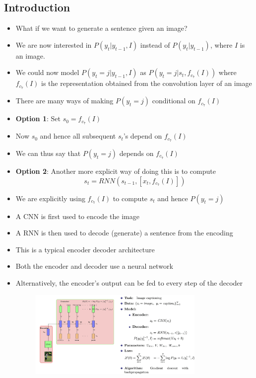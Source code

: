 \documentclass[a4paper]{article}
\begin{document}
\subsection{Introduction}
\begin{itemize}
    \item What if we want to generate a sentence given an image?
    \item We are now interested in $P(y_t|y_{t-1},I)$ instead of $P(y_t|y_{t-1})$, where $I$ is an image.
    \item We could now model $P(y_t = j|y_{t-1},I)$ as $P(y_t=j|s_t,f_{c_7}(I))$ where $f_{c_7}(I)$ is the representation obtained from the convolution layer of an image
    \item There are many ways of making $P(y_t = j)$ conditional on $f_{c_7}(I)$
    \item \textbf{Option 1}: Set $s_0 = f_{c_7}(I)$
    \item Now $s_0$ and hence all subsequent $s_t$’s depend on $f_{c_7}(I)$
    \item We can thus say that $P(y_t = j)$ depends on $f_{c_7}(I)$
    \item \textbf{Option 2}: Another more explicit way of doing this is to compute
    \begin{equation*}
        s_t=RNN(s_{t-1},[x_t,f_{c_7}(I)])
    \end{equation*}
    \item We are explicitly using $f_{c_7}(I)$ to compute $s_t$ and hence $P(y_t = j)$
    \item A CNN is first used to encode the image
    \item A RNN is then used to decode (generate) a sentence from the encoding
    \item This is a typical encoder decoder architecture
    \item Both the encoder and decoder use a neural network
    \item Alternatively, the encoder’s output can be fed to every step of the decoder
    \begin{figure}[H]
        \centering
        \includegraphics[width=0.8\textwidth]{Degree//static/DL_encoder_decoder.png}

\end{figure}
\end{itemize}
\end{document}
